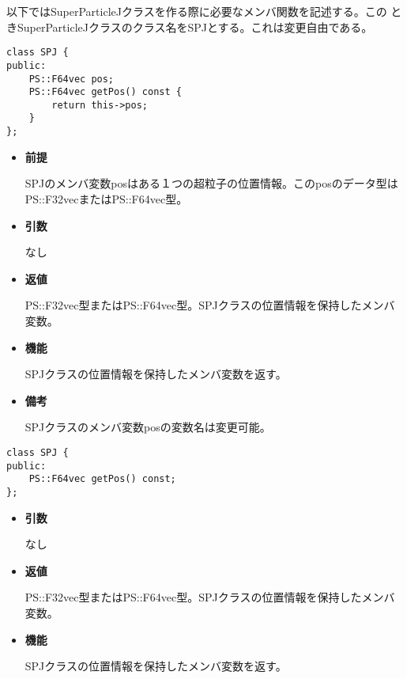 以下ではSuperParticleJクラスを作る際に必要なメンバ関数を記述する。この
ときSuperParticleJクラスのクラス名をSPJとする。これは変更自由である。


\begin{screen}
\begin{verbatim}
class SPJ {
public:
    PS::F64vec pos;
    PS::F64vec getPos() const {
        return this->pos;
    }
};
\end{verbatim}
\end{screen}

\begin{itemize}

\item {\bf 前提}
  
  SPJのメンバ変数posはある１つの超粒子の位置情報。このposのデータ型は
  PS::F32vecまたはPS::F64vec型。
  
\item {\bf 引数}

  なし
  
\item {\bf 返値}

  PS::F32vec型またはPS::F64vec型。SPJクラスの位置情報を保持したメンバ
  変数。
  
\item {\bf 機能}

  SPJクラスの位置情報を保持したメンバ変数を返す。
  
\item {\bf 備考}

  SPJクラスのメンバ変数posの変数名は変更可能。

\end{itemize}
\fi

\begin{screen}
\begin{verbatim}
class SPJ {
public:
    PS::F64vec getPos() const;
};
\end{verbatim}
\end{screen}

\begin{itemize}

\item {\bf 引数}

  なし
  
\item {\bf 返値}

  PS::F32vec型またはPS::F64vec型。SPJクラスの位置情報を保持したメンバ
  変数。
  
\item {\bf 機能}

  SPJクラスの位置情報を保持したメンバ変数を返す。
  
\end{itemize}


